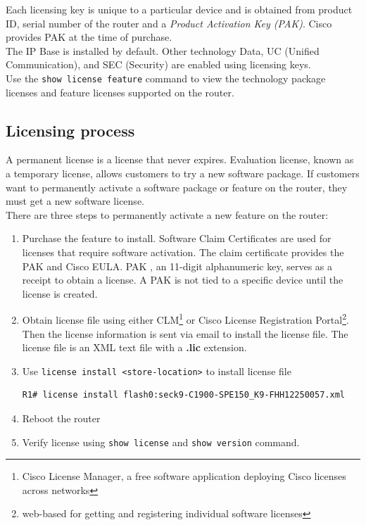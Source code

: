 Each licensing key is unique to a particular device and is obtained from product ID, serial number of the router and a \emph{Product Activation Key (PAK)}. Cisco provides PAK at the time of purchase. \\

The IP Base is installed by default. Other technology Data, UC (Unified Communication), and SEC (Security) are enabled using licensing keys.\\

Use the \verb|show license feature| command to view the technology package licenses and feature licenses supported on the router.

\subsection{Licensing process}

A permanent license is a license that never expires. Evaluation license, known as a temporary license, allows customers to try a new software package. If customers want to permanently activate a software package or feature on the router, they must get a new software license.\\

There are three steps to permanently activate a new feature on the router:

\begin{enumerate}
\item Purchase the feature to install. Software Claim Certificates are used for licenses that require software activation. The claim certificate provides the PAK and Cisco EULA. PAK , an 11-digit alphanumeric key, serves as a receipt to obtain a license. A PAK
is not tied to a specific device until the license is created. 

\item Obtain license file using either CLM\footnote{Cisco License Manager, a free software application deploying Cisco licenses across networks} or Cisco License Registration Portal\footnote{web-based for getting and registering individual software licenses}. Then the license information is sent via email to install the license file. The license file is an XML  text file with a \textbf{.lic} extension.

\item Use \verb|license install <store-location>| to install license file

\begin{verbatim}
R1# license install flash0:seck9-C1900-SPE150_K9-FHH12250057.xml
\end{verbatim}

\item Reboot the router

\item Verify license using \verb|show license| and \verb|show version| command.
\end{enumerate}

